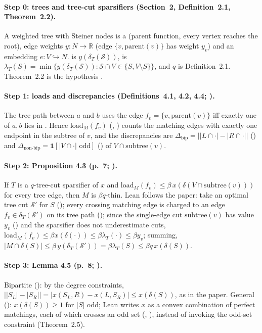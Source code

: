 \paragraph{Step 0: trees and tree-cut sparsifiers (Section~2, Definition~2.1, Theorem~2.2).}
A weighted tree with Steiner nodes is a  (parent function, every vertex reaches the root),
edge weights $y:N\to\mathbb R$ (edge $\{v,\mathrm{parent}(v)\}$ has weight $y_v$) and an embedding
$e:V\hookrightarrow N$.  is $y(\delta_T(\mathcal S))$,  is
$\lambda_T(S)=\min\{y(\delta_T(\mathcal S)):\mathcal S\cap V\in\{S,V\setminus S\}\}$, and
 $q$ is Definition~2.1. Theorem~2.2 is the hypothesis .

\paragraph{Step 1: loads and discrepancies (Definitions~4.1, 4.2, 4.4; ).}
The tree path between $a$ and $b$ uses the edge $f_v=\{v,\mathrm{parent}(v)\}$ iff exactly one of $a,b$ lies in
. Hence $\mathrm{load}_M(f_v)$ (, ) counts the matching edges with
exactly one endpoint in the subtree of $v$, and the discrepancies are
$\Delta_{\mathrm{bip}}=\bigl||L\cap\cdot|-|R\cap\cdot|\bigr|$ () and
$\Delta_{\mathrm{non\text{-}bip}}=\mathbf 1[|V\cap\cdot|\text{ odd}]$ () of $V\cap\mathrm{subtree}(v)$.

\paragraph{Step 2: Proposition 4.3 (p.~7; ).}
If $T$ is a $q$-tree-cut sparsifier of $x$ and $\mathrm{load}_M(f_v)\le\beta\,x(\delta(V\cap\mathrm{subtree}(v)))$
for every tree edge, then $M$ is $\beta q$-thin. Lean follows the paper: take an optimal tree cut $\mathcal S'$
for $S$ (); every crossing matching edge is charged to an edge
$f_v\in\delta_T(\mathcal S')$ on its tree path (); since the single-edge cut
$\mathrm{subtree}(v)$ has value $y_v$ () and the sparsifier does not underestimate
cuts, $\mathrm{load}_M(f_v)\le\beta x(\delta(\cdot))\le\beta\lambda_T(\cdot)\le\beta y_v$; summing,
$|M\cap\delta(S)|\le\beta\,y(\delta_T(\mathcal S'))=\beta\lambda_T(S)\le\beta q\,x(\delta(S))$.

\paragraph{Step 3: Lemma 4.5 (p.~8; ).}
Bipartite (): by the degree constraints,
$\bigl||S_L|-|S_R|\bigr|=|x(S_L,R)-x(L,S_R)|\le x(\delta(S))$, as in the paper.
General (): $x(\delta(S))\ge1$ for $|S|$ odd; Lean writes $x$ as a convex combination of
perfect matchings, each of which crosses an odd set (,
), instead of invoking the odd-set constraint (Theorem~2.5).

